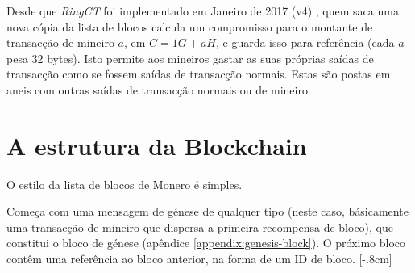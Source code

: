 Desde que {\em RingCT} foi implementado em Janeiro de 2017 (v4) \cite{ringct-dates},
quem saca uma nova cópia da lista de blocos calcula um compromisso para o montante de transacção de mineiro  $a$, em $C = 1G + aH$, e guarda isso para referência (cada $a$ pesa 32 bytes). Isto permite aos mineiros gastar as suas próprias saídas de transacção como se fossem saídas de transacção normais. Estas são postas em aneis com outras saídas de transacção normais ou de mineiro.





\section{A estrutura da Blockchain}

\label{sec:blockchain-structure}

O estilo da lista de blocos de Monero é simples.

Começa com uma mensagem de génese de qualquer tipo (neste caso, básicamente uma transacção de mineiro que dispersa a primeira recompensa de bloco), que constitui o bloco de génese (apêndice \ref{appendix:genesis-block}). O próximo bloco contêm uma referência ao bloco anterior, na forma de um ID de bloco.
[-.8cm] 

